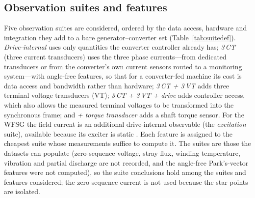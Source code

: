 \subsection{Observation suites and features}\label{sec:suites}

Five observation suites are considered, ordered by the data access, hardware and integration they add to a bare generator--converter set (Table~\ref{tab:suitedef}). \emph{Drive-internal} uses only quantities the converter controller already has; \emph{3\,CT} (three current transducers) uses the three phase currents---from dedicated transducers or from the converter's own current sensors routed to a monitoring system---with angle-free features, so that for a converter-fed machine its cost is data access and bandwidth rather than hardware; \emph{3\,CT + 3\,VT} adds three terminal voltage transducers (VT); \emph{3\,CT + 3\,VT + drive} adds controller access, which also allows the measured terminal voltages to be transformed into the synchronous frame; and \emph{+ torque transducer} adds a shaft torque sensor. For the WFSG the field current is an additional drive-internal observable (the \emph{excitation} suite), available because its exciter is static \citep{Neti2009}. Each feature is assigned to the cheapest suite whose measurements suffice to compute it. The suites are those the datasets can populate (zero-sequence voltage, stray flux, winding temperature, vibration and partial discharge are not recorded, and the angle-free Park's-vector features were not computed), so the suite conclusions hold among the suites and features considered; the zero-sequence current is not used because the star points are isolated.

